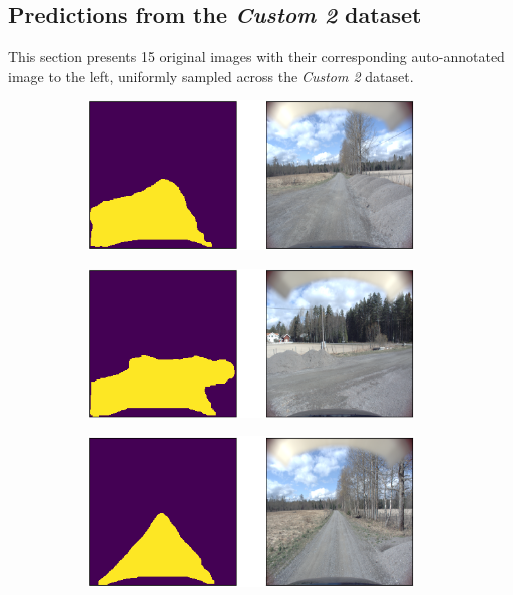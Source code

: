 \documentclass[USenglish]{ifimaster}  %
\begin{document}
\begin{appendices}
\section{Predictions from the \textit{Custom 2} dataset}\label{appendix_2}
This section presents 15 original images with their corresponding auto-annotated image to the left, uniformly sampled across the \textit{Custom 2} dataset.

\begin{figure}[ht]
\centering
\begin{subfigure}[b]{\textwidth}
\centering
\includegraphics[width=0.95\textwidth]{bilder/appendix_2/108.png}
\end{subfigure}
\hfill
\begin{subfigure}[b]{\textwidth}
\centering
\includegraphics[width=0.95\textwidth]{bilder/appendix_2/209.png}
\end{subfigure}
\hfill
\begin{subfigure}[b]{\textwidth}
\centering
\includegraphics[width=0.95\textwidth]{bilder/appendix_2/265.png}

\end{subfigure}
\end{figure}
\end{appendices}
\end{document}
